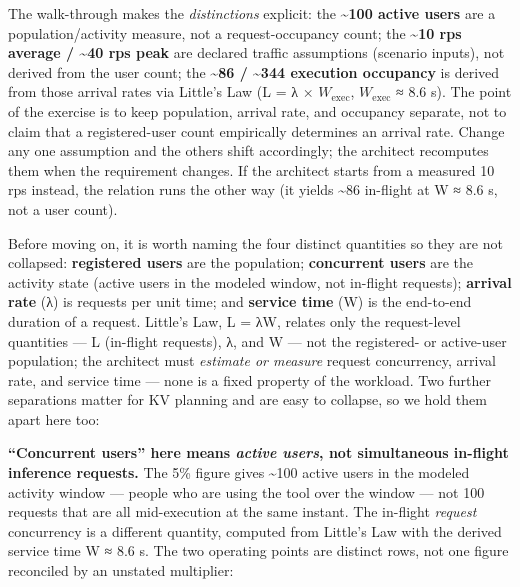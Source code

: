 The walk-through makes the \emph{distinctions} explicit: the
\textbf{\textasciitilde100 active users} are a population/activity
measure, not a request-occupancy count; the \textbf{\textasciitilde10
rps average / \textasciitilde40 rps peak} are declared traffic
assumptions (scenario inputs), not derived from the user count; the
\textbf{\textasciitilde86 / \textasciitilde344 execution occupancy} is
derived from those arrival rates via Little's Law (L = λ ×
\(W_{\mathrm{exec}}\), \(W_{\mathrm{exec}}\) ≈ 8.6 s). The point of the
exercise is to keep population, arrival rate, and occupancy separate,
not to claim that a registered-user count empirically determines an
arrival rate. Change any one assumption and the others shift
accordingly; the architect recomputes them when the requirement changes.
If the architect starts from a measured 10 rps instead, the relation
runs the other way (it yields \textasciitilde86 in-flight at W ≈ 8.6 s,
not a user count).

Before moving on, it is worth naming the four distinct quantities so
they are not collapsed: \textbf{registered users} are the population;
\textbf{concurrent users} are the activity state (active users in the
modeled window, not in-flight requests); \textbf{arrival rate} (λ) is
requests per unit time; and \textbf{service time} (W) is the end-to-end
duration of a request. Little's Law, L = λW, relates only the
request-level quantities --- L (in-flight requests), λ, and W --- not
the registered- or active-user population; the architect must
\emph{estimate or measure} request concurrency, arrival rate, and
service time --- none is a fixed property of the workload. Two further
separations matter for KV planning and are easy to collapse, so we hold
them apart here too:

\textbf{``Concurrent users'' here means \emph{active users}, not
simultaneous in-flight inference requests.} The 5\% figure gives
\textasciitilde100 active users in the modeled activity window ---
people who are using the tool over the window --- not 100 requests that
are all mid-execution at the same instant. The in-flight \emph{request}
concurrency is a different quantity, computed from Little's Law with the
derived service time W ≈ 8.6 s. The two operating points are distinct
rows, not one figure reconciled by an unstated multiplier:

